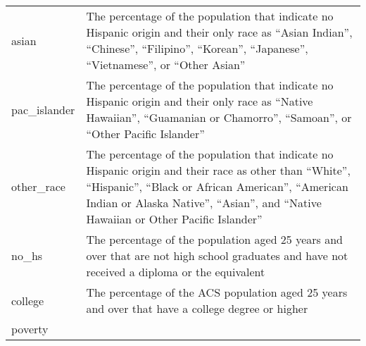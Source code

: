 \documentclass[12pt,twoside]{reedthesis}
\theoremstyle{definition}
\theoremstyle{definition}
\theoremstyle{definition}
\theoremstyle{remark}
\begin{document}
\begin{longtable}[]{@{}ll@{}}
\begin{minipage}[t]{0.44\columnwidth}
asian\strut
\end{minipage} & \begin{minipage}[t]{0.50\columnwidth}\raggedright
The percentage of the population that indicate no Hispanic origin and
their only race as ``Asian Indian'', ``Chinese'', ``Filipino'',
``Korean'', ``Japanese'', ``Vietnamese'', or ``Other Asian''\strut
\end{minipage}\tabularnewline
\begin{minipage}[t]{0.44\columnwidth}\raggedright
pac\_islander\strut
\end{minipage} & \begin{minipage}[t]{0.50\columnwidth}\raggedright
The percentage of the population that indicate no Hispanic origin and
their only race as ``Native Hawaiian'', ``Guamanian or Chamorro'',
``Samoan'', or ``Other Pacific Islander''\strut
\end{minipage}\tabularnewline
\begin{minipage}[t]{0.44\columnwidth}\raggedright
other\_race\strut
\end{minipage} & \begin{minipage}[t]{0.50\columnwidth}\raggedright
The percentage of the population that indicate no Hispanic origin and
their race as other than ``White'', ``Hispanic'', ``Black or African
American'', ``American Indian or Alaska Native'', ``Asian'', and
``Native Hawaiian or Other Pacific Islander''\strut
\end{minipage}\tabularnewline
\begin{minipage}[t]{0.44\columnwidth}\raggedright
no\_hs\strut
\end{minipage} & \begin{minipage}[t]{0.50\columnwidth}\raggedright
The percentage of the population aged 25 years and over that are not
high school graduates and have not received a diploma or the
equivalent\strut
\end{minipage}\tabularnewline
\begin{minipage}[t]{0.44\columnwidth}\raggedright
college\strut
\end{minipage} & \begin{minipage}[t]{0.50\columnwidth}\raggedright
The percentage of the ACS population aged 25 years and over that have a
college degree or higher\strut
\end{minipage}\tabularnewline
\begin{minipage}[t]{0.44\columnwidth}\raggedright
poverty\strut
\end{minipage} & \begin{minipage}[t]{0.50\columnwidth}\raggedright

\end{minipage}
\end{longtable}
\end{document}
